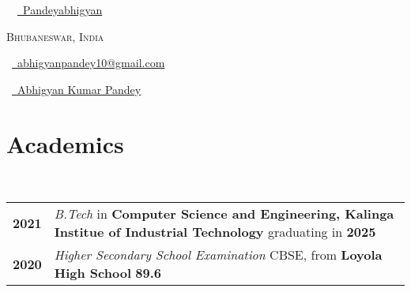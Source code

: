 \documentclass[a4paper,10pt]{extarticle} %
\begin{document}
\pagestyle{empty} %


\vspace{0.4cm}

\begin{multicols}{3}
\
\normalsize \faGithub\ {\href{https://github.com/Pandeyabhigyan}{\  Pandeyabhigyan}}\\
\columnbreak
\normalsize\par{\centering{\huge\textsc{\textcolor{primary}{Abhigyan Kumar Pandey}}}\par} %
\par{\centering\normalsize {\large{\textsc{Bhubaneswar, India}}}\hfill\par}
\columnbreak
\raggedright\hfill\normalsize \faEnvelope\ {\href{mailto:abhigyanpandey10@gmail.com}{\  abhigyanpandey10@gmail.com}}\\
\raggedright\hfill\normalsize \faLinkedinSquare\ {\href{https://www.linkedin.com/in/abhigyan-kumar-pandey-a410b7239/}{\  Abhigyan Kumar Pandey}}\\

\end{multicols}
\vspace{0.6 cm}


\vspace{0.2cm}
\section{\LARGE{\textcolor{primary}{Academics}}}\\[4mm]

\begin{tabular}{r|p{17.5cm}}\\	



\Large{\textbf{2021}} & \Large{\textit{ B.Tech} in \textbf{Computer Science and Engineering, Kalinga Institue of Industrial Technology } graduating in \textbf{2025}} \\
[8mm]




\Large{\textbf{2020}} & \Large{\textit{Higher Secondary School Examination} CBSE, from  \textbf{Loyola High School} \textbf{89.6}} \\
 



\end{tabular}
\end{document}
